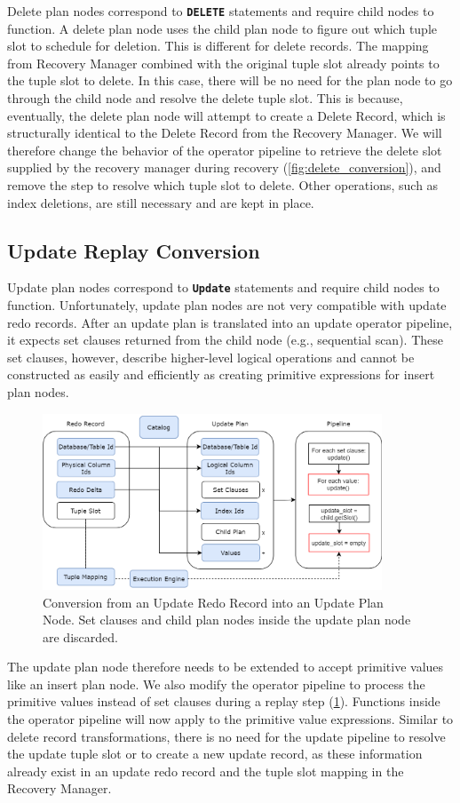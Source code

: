 \documentclass[12pt]{cmuthesis}
\newcommand{\dbSQL}[1]{\texttt{\textbf{#1}}\xspace}
\begin{document}
Delete plan nodes correspond to \dbSQL{DELETE} statements and require child nodes to function. A delete plan node uses the child plan node to figure out which tuple slot to schedule for deletion. This is different for delete records. The mapping from Recovery Manager combined with the original tuple slot already points to the tuple slot to delete. In this case, there will be no need for the plan node to go through the child node and resolve the delete tuple slot. This is because, eventually, the delete plan node will attempt to create a Delete Record, which is structurally identical to the Delete Record from the Recovery Manager. We will therefore change the behavior of the operator pipeline to retrieve the delete slot supplied by the recovery manager during recovery (\cref{fig:delete_conversion}), and remove the step to resolve which tuple slot to delete. Other operations, such as index deletions, are still necessary and are kept in place.

\subsection{Update Replay Conversion}
Update plan nodes correspond to \dbSQL{Update} statements and require child nodes to function. Unfortunately, update plan nodes are not very compatible with update redo records. After an update plan is translated into an update operator pipeline, it expects set clauses returned from the child node (e.g., sequential scan). These set clauses, however, describe higher-level logical operations and cannot be constructed as easily and efficiently as creating primitive expressions for insert plan nodes. 
\begin{figure}[t!]
\centering
\includegraphics[width=0.9\textwidth]{images/UpdateConversion.png}
\caption{Conversion from an Update Redo Record into an Update Plan Node. Set clauses and child plan nodes inside the update plan node are discarded.}
\label{fig:update_conversion}
\end{figure}
The update plan node therefore needs to be extended to accept primitive values like an insert plan node. We also modify the operator pipeline to process the primitive values instead of set clauses during a replay step (\cref{fig:update_conversion}). Functions inside the operator pipeline will now apply to the primitive value expressions. Similar to delete record transformations, there is no need for the update pipeline to resolve the update tuple slot or to create a new update record, as these information already exist in an update redo record and the tuple slot mapping in the Recovery Manager.
\end{document}
